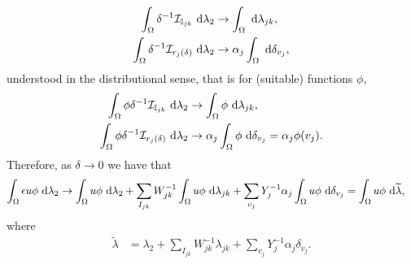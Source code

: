 \begin{align*}
	\int_{\Omega} \delta^{-1}\mathcal{I}_{\mathbb{I}_{jk}}  \ \mathrm{d}\lambda_2
	&\rightarrow \int_{\Omega}  \ \mathrm{d}\lambda_{jk}, \\
	\int_{\Omega} \delta^{-1}\mathcal{I}_{r_j(\delta)} \ \mathrm{d}\lambda_2
	&\rightarrow \alpha_j\int_{\Omega}  \ \mathrm{d}\delta_{v_j},
\end{align*}
understood in the distributional sense, that is for (suitable) functions $\phi$,
\begin{align*}
	\int_{\Omega} \phi\delta^{-1}\mathcal{I}_{\mathbb{I}_{jk}}  \ \mathrm{d}\lambda_2
	&\rightarrow \int_{\Omega} \phi  \ \mathrm{d}\lambda_{jk}, \\
	\int_{\Omega} \phi \delta^{-1}\mathcal{I}_{r_j(\delta)} \ \mathrm{d}\lambda_2
	&\rightarrow \alpha_j\int_{\Omega} \phi  \ \mathrm{d}\delta_{v_j} = \alpha_j\phi(v_j).
\end{align*}
Therefore, as $\delta\rightarrow0$ we have that
\begin{align*}
	\int_{\Omega}\epsilon u\phi \ \mathrm{d}\lambda_2
	&\rightarrow \int_{\Omega}u\phi \ \mathrm{d}\lambda_2
	+ \sum_{I_{jk}} W_{jk}^{-1}\int_{\Omega}u\phi \ \mathrm{d}\lambda_{jk}
	+ \sum_{v_j} Y_{j}^{-1}\alpha_j\int_{\Omega}u\phi \ \mathrm{d}\delta_{v_j}
	= \int_{\Omega}u\phi \ \mathrm{d}\widetilde{\lambda},
\end{align*}
where
\begin{align*}
	\widetilde{\lambda} &= \lambda_2 + \sum_{I_{jk}} W_{jk}^{-1} \lambda_{jk} + \sum_{v_j}Y_{j}^{-1}\alpha_j\delta_{v_j}.
\end{align*}

